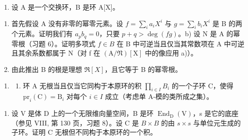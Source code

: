 \begin{enumerate}
\def\labelenumi{\arabic{enumi})}
\setcounter{enumi}{10}
\tightlist
\item
  设 A 是一个交换环，B 是环 A{[}X{]}。
\end{enumerate}

\begin{enumerate}
\def\labelenumi{\alph{enumi})}
\item
  首先假设 A 没有非零的幂零元素。设 \(f = \sum_{i} a_{i} X^{i}\) 与 \(g = \sum_{i} b_{i} X^{i}\) 是 B 的两个元素。证明我们有 \(a_{p} b_{q} = 0\)，只要 \(p + q > \deg(fg)\)。b) 设 N 是 A 的幂零根（习题 6）。证明多项式 \(f \in B\) 在 B 中可逆当且仅当其常数项在 A 中可逆且其余系数都属于 N（对 f 在 \((\mathrm{A}/\mathfrak{N})[\mathrm{X}]\) 中的像应用 a)）。
\item
  由此推出 B 的根是理想 \(\Re[X]\)，且它等于 B 的幂零根。
\end{enumerate}

\begin{enumerate}
\def\labelenumi{\arabic{enumi})}
\setcounter{enumi}{11}
\tightlist
\item
  \begin{enumerate}
  \def\labelenumii{\alph{enumii})}
  \tightlist
  \item
    环 A 无根当且仅当它同构于本原环的积 \(\prod_{i\in I}B_{i}\) 的一个子环 C，使得 \(\mathrm{pr}_{i}(\mathrm{C})=\mathrm{B}_{i}\) 对每个 \(i\in I\) 成立（考虑单 A-模的类所成之集）。
  \end{enumerate}
\end{enumerate}

\begin{enumerate}
\def\labelenumi{\alph{enumi})}
\setcounter{enumi}{1}
\tightlist
\item
  设 V 是体 D 上的一个无限维向量空间，B 是环 \(\operatorname{End}_{\mathrm{D}}(\mathrm{V})\)，s 是它的底座（参见 VIII, 第 130 页，习题 8）。设 C 是 \(B \times B\) 的由 \(s \times s\) 与单位元生成的子环。证明 C 无根但不同构于本原环的一个积。
\end{enumerate}

